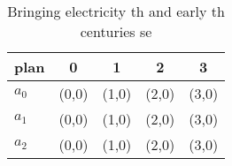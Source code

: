 \documentclass[a4paper]{article}
\begin{document}
\begin{table}
\begin{adjustbox}{width=0.6\columnwidth}
\begin{tabular}{|l|l|l|l|l|}
\hline
\textbf{plan} & \multicolumn{1}{c|}{\textbf{0}} & \multicolumn{1}{c|}{\textbf{1}} & \multicolumn{1}{c|}{\textbf{2}} & \multicolumn{1}{c|}{\textbf{3}} \\ \hline
\textbf{$a_0$}  & (0,0) & (1,0) & (2,0) & (3,0) \\ \hline
\textbf{$a_1$}  & (0,0) & (1,0) & (2,0) & (3,0) \\ \hline
\textbf{$a_2$}  & (0,0) & (1,0) & (2,0) & (3,0) \\ \hline
\end{tabular}
\end{adjustbox}
\caption{Bringing electricity th and early th centuries se
}
\end{table}
\end{document}
